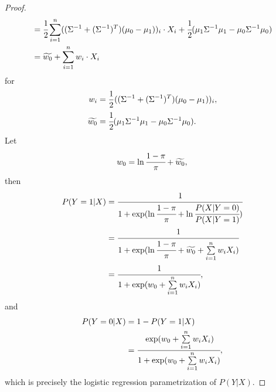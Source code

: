 \documentclass[12pt]{article}
\newcommand\inv[1]{#1^{-1}}
\begin{document}
\begin{proof}
\begin{align*}
    &= \cfrac{1}{2}\sum\limits_{i=1}^n((\Sigma^{-1} + (\Sigma^{-1})^T)(\mu_0 - \mu_1))_i\cdot X_i + \cfrac{1}{2}(\mu_{1}\inv{\Sigma}\mu_{1} - \mu_{0}\inv{\Sigma}\mu_{0}) \\
    &= \widetilde{w_0} + \sum\limits_{i=1}^n w_i\cdot X_i
  \end{align*}
  for
  \begin{align*}
    w_i &= \frac{1}{2}((\Sigma^{-1} + (\Sigma^{-1})^T)(\mu_0 - \mu_1))_i, \\
   \widetilde{w_0} &= \cfrac{1}{2}(\mu_{1}\inv{\Sigma}\mu_{1} - \mu_{0}\inv{\Sigma}\mu_{0}).
  \end{align*}
  Let
  \begin{align*}
    w_0 = \ln\cfrac{1-\pi}{\pi} + \widetilde{w_0},
  \end{align*}
  then
  \begin{align*}
    P(Y=1|X)
    &= \cfrac{1}{1+\exp(\ln\cfrac{1-\pi}{\pi} + \ln\cfrac{P(X|Y=0)}{P(X|Y=1)})} \\
    &= \cfrac{1}{1+\exp(\ln\cfrac{1-\pi}{\pi} + \widetilde{w_0} + \sum\limits_{i=1}^nw_iX_i)} \\
    &= \cfrac{1}{1+\exp(w_0 + \sum\limits_{i=1}^nw_iX_i)},
  \end{align*}
  and
  \begin{align*}
    P(Y=0|X) &= 1 - P(Y=1|X) \\
    &= \cfrac{\exp(w_0 + \sum\limits_{i=1}^nw_iX_i)}{1+\exp(w_0 + \sum\limits_{i=1}^nw_iX_i)},
  \end{align*}
  which is precisely the logistic regression parametrization of $P(Y|X)$.
\end{proof}
\end{document}
